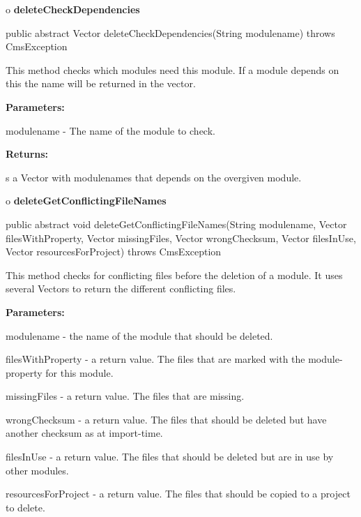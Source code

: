 o {\bf deleteCheckDependencies} 

\begin{PRE}
 public abstract Vector deleteCheckDependencies(String modulename) throws CmsException
\end{PRE}

\begin{description}
\htmlDD This method checks which modules need this module. If a module depends
on this the name will be returned in the vector. 

\begin{description}
\item {\bf Parameters:}  

modulename - The name of the module to check.  
\item {\bf Returns:}  

s a Vector with modulenames that depends on the overgiven module.  
\end{description}

\end{description}

o {\bf deleteGetConflictingFileNames} 

\begin{PRE}
 public abstract void deleteGetConflictingFileNames(String modulename,
                                                    Vector filesWithProperty,
                                                    Vector missingFiles,
                                                    Vector wrongChecksum,
                                                    Vector filesInUse,
                                                    Vector resourcesForProject) throws CmsException
\end{PRE}

\begin{description}
\htmlDD This method checks for conflicting files before the deletion of a
module. It uses several Vectors to return the different conflicting files. 

\begin{description}
\item {\bf Parameters:}  

modulename - the name of the module that should be deleted.  

filesWithProperty - a return value. The files that are marked with the
module-property for this module.  

missingFiles - a return value. The files that are missing.  

wrongChecksum - a return value. The files that should be deleted but have
another checksum as at import-time.  

filesInUse - a return value. The files that should be deleted but are in use
by other modules.  

resourcesForProject - a return value. The files that should be copied to a
project to delete.  
\end{description}

\end{description}

